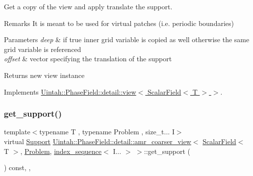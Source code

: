 Get a copy of the view and apply translate the support. 

\begin{DoxyRemark}{Remarks}
It is meant to be used for virtual patches (i.\+e. periodic boundaries)
\end{DoxyRemark}

\begin{DoxyParams}{Parameters}
{\em deep} & if true inner grid variable is copied as well otherwise the same grid variable is referenced \\
\hline
{\em offset} & vector specifying the translation of the support \\
\hline
\end{DoxyParams}
\begin{DoxyReturn}{Returns}
new view instance 
\end{DoxyReturn}


Implements \hyperlink{classUintah_1_1PhaseField_1_1detail_1_1view_3_01ScalarField_3_01T_01_4_01_4_abd928104240e329f3bc4441ebab7c50c}{Uintah\+::\+Phase\+Field\+::detail\+::view$<$ Scalar\+Field$<$ T $>$ $>$}.

\mbox{\label{classUintah_1_1PhaseField_1_1detail_1_1amr__coarser__view_3_01ScalarField_3_01T_01_4_00_01Proble9cadea116dab5bdb44bb3e29abbe99ef_a783d09b56009a7b0bcb0eb981c49a710}} 
\subsubsection{\texorpdfstring{get\+\_\+support()}{get\_support()}}
{\footnotesize\ttfamily template$<$typename T , typename Problem , size\+\_\+t... I$>$ \\
virtual \hyperlink{classUintah_1_1PhaseField_1_1Support}{Support} \hyperlink{classUintah_1_1PhaseField_1_1detail_1_1amr__coarser__view}{Uintah\+::\+Phase\+Field\+::detail\+::amr\+\_\+coarser\+\_\+view}$<$ \hyperlink{structUintah_1_1PhaseField_1_1ScalarField}{Scalar\+Field}$<$ T $>$, \hyperlink{classUintah_1_1PhaseField_1_1Problem}{Problem}, \hyperlink{namespaceUintah_1_1PhaseField_a237de804d99512e50613aff7c94a9461}{index\+\_\+sequence}$<$ I... $>$ $>$\+::get\+\_\+support (\begin{DoxyParamCaption}{ }\end{DoxyParamCaption}) const\hspace{0.3cm}{\ttfamily [inline]}, {\ttfamily [override]}, {\ttfamily [virtual]}}



